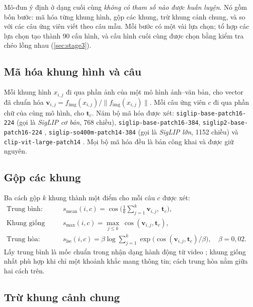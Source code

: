 \documentclass[a4paper,oneside]{report}
\begin{document}
Mô-đun ý định ở dạng cuối cùng \textit{không có tham số nào được huấn luyện}. Nó gồm bốn bước: mã hóa từng khung hình, gộp các khung, trừ khung cảnh chung, và so với các câu ứng viên viết theo câu mẫu. Mỗi bước có một vài lựa chọn; tổ hợp các lựa chọn tạo thành 90 cấu hình, và cấu hình cuối cùng được chọn bằng kiểm tra chéo lồng nhau (\cref{sec:stage3}).

\subsection{Mã hóa khung hình và câu}

Mỗi khung hình $x_{i,j}$ đi qua phần ảnh của một mô hình ảnh--văn bản, cho vector đã chuẩn hóa $\mathbf{v}_{i,j}=f_{\mathrm{img}}(x_{i,j})/\lVert f_{\mathrm{img}}(x_{i,j})\rVert$. Mỗi câu ứng viên $c$ đi qua phần chữ của cùng mô hình, cho $\mathbf{t}_c$. Năm bộ mã hóa được xét: \texttt{siglip-base-patch16-224} \citep{zhai2023siglip} (gọi là \textit{SigLIP cơ bản}, 768 chiều), \texttt{siglip-base-patch16-384}, \texttt{siglip2-base-patch16-224} \citep{tschannen2025siglip2}, \texttt{siglip-so400m-patch14-384} \citep{alabdulmohsin2023getting} (gọi là \textit{SigLIP lớn}, 1152 chiều) và \texttt{clip-vit-large-patch14} \citep{radford2021clip}. Mọi bộ mã hóa đều là bản công khai và được giữ nguyên.

\subsection{Gộp các khung}

Ba cách gộp $k$ khung thành một điểm cho mỗi câu $c$ được xét:
\begin{align}
  \text{Trung bình:}\quad & s_{\mathrm{mean}}(i,c) = \cos\Big(\tfrac{1}{k}\textstyle\sum_{j=1}^{k}\mathbf{v}_{i,j},\ \mathbf{t}_c\Big), \label{eq:mean}\\
  \text{Khung giống nhất:}\quad & s_{\max}(i,c) = \max_{j\leq k}\ \cos(\mathbf{v}_{i,j},\mathbf{t}_c), \\
  \text{Trung hòa:}\quad & s_{\mathrm{lse}}(i,c) = \beta\log\textstyle\sum_{j=1}^{k}\exp\big(\cos(\mathbf{v}_{i,j},\mathbf{t}_c)/\beta\big),\quad \beta=0{,}02.
\end{align}
Lấy trung bình là mốc chuẩn trong nhận dạng hành động từ video \citep{wang2016tsn}; khung giống nhất phù hợp khi chỉ một khoảnh khắc mang thông tin; cách trung hòa nằm giữa hai cách trên.

\subsection{Trừ khung cảnh chung}
\end{document}
